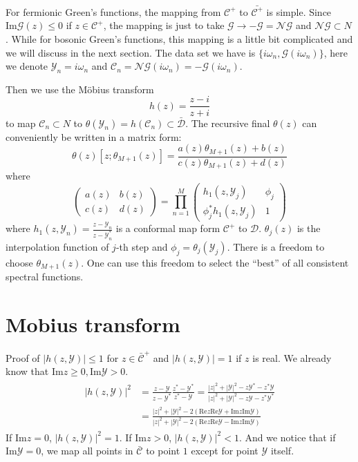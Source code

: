 \documentclass[
	preprint,%
	aps,
	prb,
	showpacs,	
	amsmath, amssymb]{revtex4-2}
\DeclareRobustCommand{\+}{\hstretch{1.25} {\boldsymbol {\mathrel{+}}}}
\newcommand{\im}{ {\mathrm{Im}} }
\newcommand{\re}{ {\mathrm{Re}} }
\newcommand{\Y}{ {\mathcal{Y}} }
\newcommand{\C}{ {\mathcal{C}} }
\newcommand{\Cbar}{ {\bar{\mathcal{C}}} }
\newcommand{\D}{ {\mathcal{D}} }
\newcommand{\Dbar}{ {\bar{\mathcal{D}}} }
\begin{document}
For fermionic Green's functions, the mapping from $\C^+$ to 
$\bar{\C^+}$ is simple. Since $\im \mathcal{G}(z) \leq 0$ if 
$z \in \C^+$, the mapping is just to take 
$\mathcal{G} \to -\mathcal{G} = \mathcal{NG}$ and $\mathcal{NG} \subset N$. While for 
bosonic Green's functions, this mapping is a little bit complicated and 
we will discuss in the next section. The data set we have is 
$\{i\omega_n, \mathcal{G}(i\omega_n)\}$, here we denote $\Y_n = i\omega_n$ 
and $\C_n = \mathcal{NG}(i\omega_n) = -\mathcal{G}(i\omega_n)$. 

Then we use the Möbius transform
\begin{equation}\label{eq:Mobius-transform}
	h(z) = \frac{z - i}{z + i}
\end{equation}
to map $\C_n \subset N$ to 
$\theta(\Y_n) = h(\C_n) \subset \Dbar$. 
The recursive final $\theta(z)$ can conveniently be written in a
matrix form:
\begin{equation}\label{eq:recursive-theta}
	\theta(z)[z;\theta_{M+1}(z)] 
		= \frac{a(z)\theta_{M+1}(z) + b(z)}{c(z)\theta_{M+1}(z) + d(z)}
\end{equation}
where
\begin{equation}\label{eq:factor-matrix}
	\left(
		\begin{matrix}
			a(z) & b(z) \\
			c(z) & d(z)
		\end{matrix}
	\right) = \prod_{n=1}^M
	\left(
		\begin{matrix}
			h_1(z, \Y_j) & \phi_j \\
			\phi_j^* h_1(z, \Y_j) & 1
		\end{matrix}
	\right)
\end{equation}
where $h_1(z, \Y_n) = \frac{z - \Y_n}{z -\Y_n^*}$ 
is a conformal map form $\C^+$ to $\D$. $\theta_j(z)$ is 
the interpolation function of $j$-th step and
$\phi_j = \theta_j(\Y_j)$. There is a freedom to choose $\theta_{M+1}(z)$.
One can use this freedom to select the “best” of all consistent spectral functions.




\appendix
\section{Mobius transform}
\label{app:mobius-transform}

Proof of $|h(z, \Y)| \leq 1$ for $z \in \Cbar^+$ and
$|h(z, \Y)| = 1$ if $z$ is real. 
We already know that $\im z \geq 0,  \im \Y >0$.
\begin{align}
\begin{split}
|h(z, \Y)|^2 &= \frac{z - \Y}{z - \Y^*} \frac{z^* - \Y^*}{z^* - \Y} 
	  = \frac{|z|^2 + |\Y|^2 - z\Y^* - z^*\Y}{|z|^2 + |\Y|^2 - z\Y - z^*\Y^*}\\
	& = \frac{|z|^2 + |\Y|^2 - 2(\re z \re \Y  + \im z \im \Y)}
		{|z|^2 + |\Y|^2 - 2(\re z \re \Y  - \im z \im \Y)}
\end{split}
\end{align}
If $\im z = 0$, $|h(z, \Y)|^2 = 1$. If $\im z > 0$, $|h(z, \Y)|^2 < 1$.
And we notice that if $\im \Y = 0$, we map all points in $\Cbar$ to 
point $1$ except for point $\Y$ itself.


\end{document}
